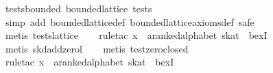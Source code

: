 \begin{isabellebody}
\endisatagproof
{\isafoldproof}%
%
\isadelimproof
\isanewline
%
\endisadelimproof
\isanewline
{}\isamarkupfalse%
\ tests{}bounded{}\ {}bounded{}lattice\ tests{}\isanewline
%
\isadelimproof
\ \ %
\endisadelimproof
%
\isatagproof
{}\isamarkupfalse%
\ {}simp\ add{}\ bounded{}lattice{}def\ bounded{}lattice{}axioms{}def{}\ safe{}\isanewline
\ \ \isamarkupfalse%
\ {}metis\ tests{}lattice{}\isanewline
\ \ \isamarkupfalse%
\ {}rule{}tac\ x\ {}\ {}{}{}{}{}a{}{}ranked{}alphabet\ skat{}\ \ bexI{}\isanewline
\ \ \isamarkupfalse%
\ {}metis\ skd{}add{}zerol{}\isanewline
\ \ \isamarkupfalse%
\ {}metis\ test{}zero{}closed{}\isanewline
\ \ \isamarkupfalse%
\ {}rule{}tac\ x\ {}\ {}{}{}{}{}a{}{}ranked{}alphabet\ skat{}\ \ bexI{}\isanewline

\end{isabellebody}
